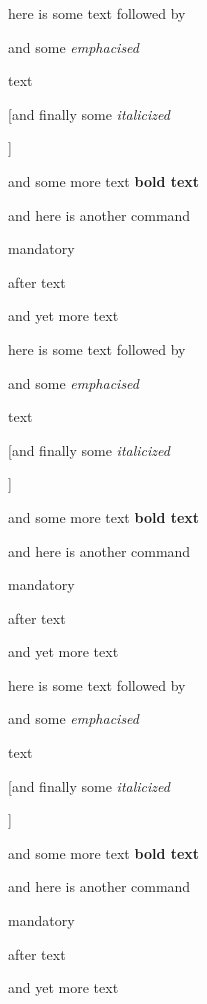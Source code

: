 here is some text followed by 

{and some \emph{emphacised}

	text}

[and finally some \itshape{italicized}

]

and
some more text \textbf{bold text}

and here is another command \cmh[optional]

{mandatory}

after text 

and yet more text

here is some text followed by 

{and some \emph{emphacised}

	text}

[and finally some \itshape{italicized}

]

and
some more text \textbf{bold text}

and here is another command \cmh[optional]

{mandatory}

after text 

and yet more text

here is some text followed by 

{and some \emph{emphacised}

	text}

[and finally some \itshape{italicized}

]

and
some more text \textbf{bold text}

and here is another command \cmh[optional]

{mandatory}

after text 

and yet more text
